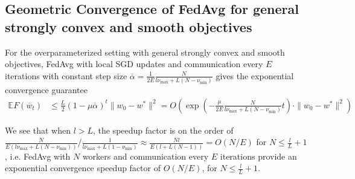
\subsection{Geometric Convergence of FedAvg for general strongly convex and smooth objectives}

\begin{thm}
	For the overparameterized setting with general strongly convex and
	smooth objectives, FedAvg with local SGD updates and communication
	every $E$ iterations with constant step size $\overline{\alpha}=\frac{1}{2E}\frac{N}{l\nu_{\max}+L(N-\nu_{\min})}$
	gives the exponential convergence guarantee 
	\begin{align*}
	\mathbb{E}F(\overline{w}_{t}) & \leq\frac{L}{2}(1-\mu\overline{\alpha})^{t}\|w_{0}-w^{\ast}\|^{2}=O(\exp(-\frac{\mu}{2E}\frac{N}{l\nu_{\max}+L(N-\nu_{\min})}t)\cdot\|w_{0}-w^{\ast}\|^{2})
	\end{align*}
\end{thm}
%
We see that when $l>L$, the speedup factor is on the order of $\frac{N}{E(l\nu_{\max}+L(N-\nu_{\min}))}/\frac{1}{l\nu_{\max}+L(1-\nu_{\min})}\approx\frac{Nl}{E(l+L(N-1))}=O(N/E)$
for $N\leq\frac{l}{L}+1$, i.e. FedAvg with $N$ workers and communication
every $E$ iterations provide an exponential convergence speedup factor
of $O(N/E)$, for $N\leq\frac{l}{L}+1$. 
